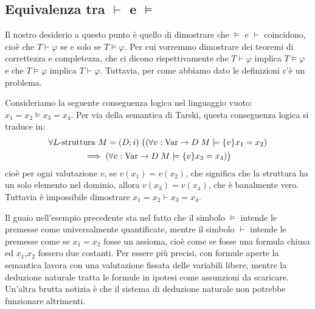 \subsection{\texorpdfstring{Equivalenza tra $\vdash$ e $\models$}{Equivalenza tra |- e |=}}
Il nostro desiderio a questo punto è quello di dimostrare che $\models$ e $\vdash$ coincidono, cioè che $T \vdash \varphi$ se e solo se $T \models \varphi$. Per cui vorremmo dimostrare dei teoremi di correttezza e completezza, che ci dicono rispettivamente che $T \vdash \varphi$ implica $T \models \varphi$ e che $T \models \varphi$ implica $T \vdash \varphi$.
Tuttavia, per come abbiamo dato le definizioni c'è un problema.

\begin{example}
    Consideriamo la seguente conseguenza logica nel linguaggio vuoto: $x_1 = x_2 \models x_3 = x_4$. Per via della semantica di Tarski, questa conseguenza logica si traduce in:
    \begin{multline*}
        \forall \text{$L$-struttura } M=(D;i)\;\big((\forall v:\operatorname{Var}\to D\; M \models \{v\}x_1 = x_2) \\
        \implies (\forall v:\operatorname{Var}\to D\; M \models \{v\}x_3 = x_4)\big)
    \end{multline*}
    cioè per ogni valutazione $v$, se $v(x_1) = v(x_2)$, che significa che la struttura ha un solo elemento nel dominio, allora $v(x_3) = v(x_4)$, che è banalmente vero. Tuttavia è impossibile dimostrare $x_1 = x_2 \vdash x_3 = x_4$.
\end{example}

Il guaio nell'esempio precedente sta nel fatto che il simbolo $\models$ intende le premesse come universalmente quantificate, mentre il simbolo $\vdash$ intende le premesse come se $x_1 = x_2$ fosse un assioma, cioè come se fosse una formula chiusa ed $x_1$,$x_2$ fossero due costanti.
Per essere più precisi, con formule aperte la semantica lavora con una valutazione fissata delle variabili libere, mentre la deduzione naturale tratta le formule in ipotesi come assunzioni da scaricare.\\
Un'altra brutta notizia è che il sistema di deduzione naturale non potrebbe funzionare altrimenti. 


